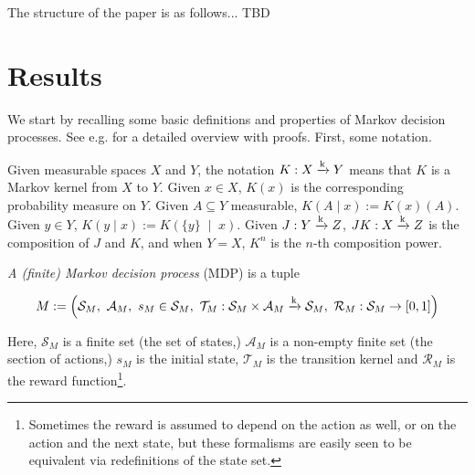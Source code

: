 \documentclass[anon,12pt]{colt2018} %
\newcommand{\Comment}[1]{}
\newcommand{\AP}[1]{\left(#1\right)}
\newcommand{\APM}[2]{\left(#1\;\middle\vert\;#2\right)}
\newcommand{\K}{\xrightarrow{\textnormal{k}}}
\newcommand{\A}{\mathcal{A}}
\newcommand{\St}{\mathcal{S}}
\newcommand{\T}{\mathcal{T}}
\newcommand{\R}{\mathcal{R}}
\begin{document}
\Comment{We also consider situations in which there are states of the environment (that we call \enquote{corrupted}) for which the reward signal and/or the advisor become unreliable (i.e. the observed reward in these states might be different from the \enquote{true} reward w.r.t. which regret is defined, and the advisor in these states might fail to satisfy the assumptions we otherwise require from it.) For example, we might imagine a robot that, through its own actions, damages its own input channels or even provides \enquote{deliberately} misleading information to the human operator. Indeed, it has been argued~\cite{TBD} that reinforcement learning agents are incentivized to sabotage themselves in this way (for example \enquote{wirehead} i.e. tamper with itself in order to artificially set the reward to maximum) and therefore sufficiently powerful algorithms (beyond the current state of the art) are almost guaranteed to do so. We show that, assuming corrupted states can be avoided without sacrificing utility, and that the advisor in uncorrupted states never acts so as to enter a corrupted state, DRL can be used to achieve essentially the same regret bound as before (and in particular learn to avoid corruption.) Thus DRL not only combats traps in the external environment but also perverse incentives inside the agent itself.}

The structure of the paper is as follows... TBD

\section{Results}

We start by recalling some basic definitions and properties of Markov decision processes. See e.g. \cite{Feinberg2002} for a detailed overview with proofs. First, some notation. 

Given measurable spaces $X$ and $Y$, the notation $K: X \K Y$ means that $K$ is a Markov kernel from $X$ to $Y$. Given $x \in X$, $K(x)$ is the corresponding probability measure on $Y$. Given $A \subseteq Y$ measurable, $K(A \mid x) := K(x)(A)$. Given $y \in Y$, $K(y \mid x):=K\APM{\{y\}}{x}$. Given $J: Y \K Z$, $JK: X \K Z$ is the composition of $J$ and $K$, and when $Y = X$, $K^n$ is the $n$-th composition power.

\begin{samepage}
\begin{definition}

\emph{A (finite) Markov decision process} (MDP) is a tuple

$$M:=\AP{\St_M,\ \A_M,\ s_M\in \St_M,\ \T_M: \St_M \times \A_M \K \St_M,\ \R_M: \St_M \rightarrow [0,1]}$$

Here, $\St_M$ is a finite set (the set of states,) $\A_M$ is a non-empty finite set (the section of actions,) $s_M$ is the initial state, $\T_M$ is the transition kernel and $\R_M$ is the reward function\footnote{Sometimes the reward is assumed to depend on the action as well, or on the action and the next state, but these formalisms are easily seen to be equivalent via redefinitions of the state set.}.

\end{definition}
\end{samepage}
\end{document}
